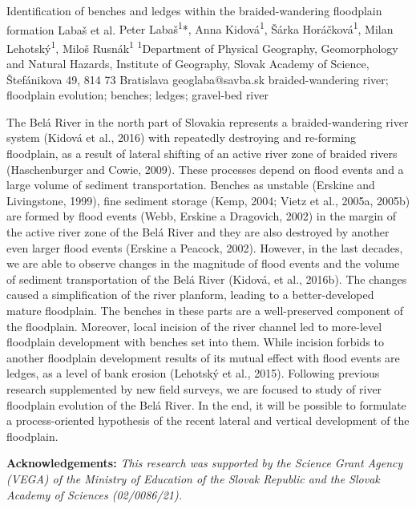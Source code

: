 \abstract
{Identification of benches and ledges within the braided-wandering floodplain formation} %
{Labaš et al.} %
{Peter Labaš\textsuperscript{1}*, Anna Kidová\textsuperscript{1}, Šárka Horáčková\textsuperscript{1}, Milan Lehotský\textsuperscript{1}, Miloš Rusnák\textsuperscript{1}
} %
{\TLtag} %
{\textsuperscript{1}Department of Physical Geography, Geomorphology and Natural Hazards, Institute of Geography, Slovak Academy of Science, Štefánikova 49, 814 73 Bratislava} %
{geoglaba@savba.sk}  %
{braided-wandering river; floodplain evolution; benches; ledges; gravel-bed river}%
{The Belá River in the north part of Slovakia represents a braided-wandering river system (Kidová et al., 2016) with repeatedly destroying and re-forming floodplain, as a result of lateral shifting of an active river zone of braided rivers (Haschenburger and Cowie, 2009). These processes depend on flood events and a large volume of sediment transportation. Benches as unstable (Erskine and Livingstone, 1999), fine sediment storage (Kemp, 2004; Vietz et al., 2005a, 2005b) are formed by flood events (Webb, Erskine a Dragovich, 2002) in the margin of the active river zone of the Belá River and they are also destroyed by another even larger flood events (Erskine a Peacock, 2002). However, in the last decades, we are able to observe changes in the magnitude of flood events and the volume of sediment transportation of the Belá River (Kidová, et al., 2016b). The changes caused a simplification of the river planform, leading to a better-developed mature floodplain. The benches in these parts are a well-preserved component of the floodplain. Moreover, local incision of the river channel led to more-level floodplain development with benches set into them. While incision forbids to another floodplain development results of its mutual effect with flood events are ledges, as a level of bank erosion (Lehotský et al., 2015). Following previous research supplemented by new field surveys, we are focused to study of river floodplain evolution of the Belá River. In the end, it will be possible to formulate a process-oriented hypothesis of the recent lateral and vertical development of the floodplain.

\vspace{0.5em}
\noindent
\textbf{Acknowledgements:}
\textit{This research was supported by the Science Grant Agency (VEGA) of the Ministry of Education of the Slovak Republic and the Slovak Academy of Sciences (02/0086/21).}
}%
